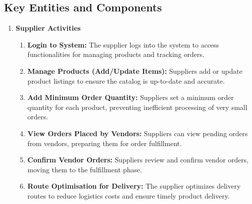 \subsection{Key Entities and Components}
\begin{enumerate}
    \item \textbf{Supplier Activities}
          \begin{enumerate}
              \item \textbf{Login to System:} The supplier logs into the system to access functionalities for managing products and tracking orders.
              \item \textbf{Manage Products (Add/Update Items):} Suppliers add or update product listings to ensure the catalog is up-to-date and accurate.
              \item \textbf{Add Minimum Order Quantity:} Suppliers set a minimum order quantity for each product, preventing inefficient processing of very small orders.
              \item \textbf{View Orders Placed by Vendors:} Suppliers can view pending orders from vendors, preparing them for order fulfillment.
              \item \textbf{Confirm Vendor Orders:} Suppliers review and confirm vendor orders, moving them to the fulfillment phase.
              \item \textbf{Route Optimisation for Delivery:} The supplier optimizes delivery routes to reduce logistics costs and ensure timely product delivery.
          \end{enumerate}


\end{enumerate}

